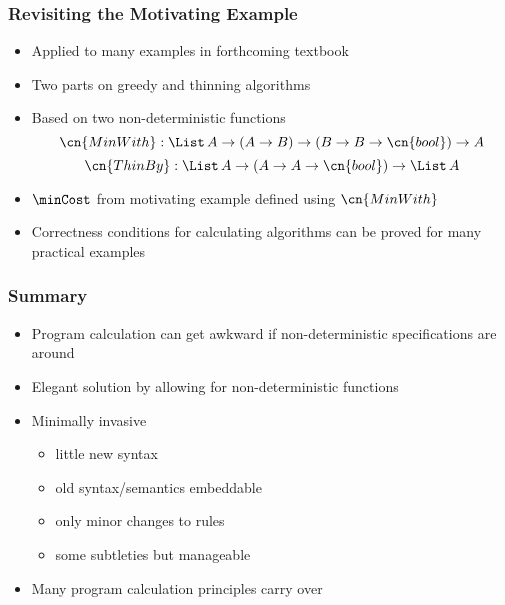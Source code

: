 \documentclass{beamer}
\def\prop{\cn{bool}}
\begin{document}
\begin{frame}\frametitle{Revisiting the Motivating Example}
\begin{itemize}
\item Applied to many examples in forthcoming textbook
\item Two parts on greedy and thinning algorithms
\item Based on two non-deterministic functions
 \[\cn{MinWith}:\List\,A\to(A\to B)\to (B\to B\to\prop)\to A\]
 \[\cn{ThinBy}:\List\,A\to(A\to A\to\prop)\to \List\,A\]
\item $\minCost$ from motivating example defined using $\cn{MinWith}$
\item Correctness conditions for calculating algorithms can be proved for many practical examples
\end{itemize}
\end{frame}


\begin{frame}\frametitle{Summary}
\begin{itemize}
\item Program calculation can get awkward if non-deterministic specifications are around
\item Elegant solution by allowing for non-deterministic functions
\item Minimally invasive
 \begin{itemize}
 \item little new syntax
 \item old syntax/semantics embeddable
 \item only minor changes to rules 
 \item some subtleties but manageable
 \end{itemize}
\item Many program calculation principles carry over
\end{itemize}
\end{frame}
\end{document}
